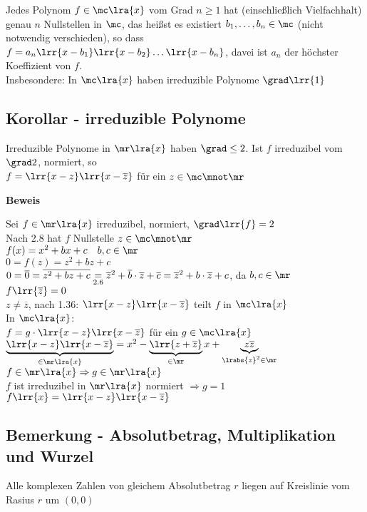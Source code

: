 	Jedes Polynom $f\in\mc\lra{x}$ vom Grad $n\geq 1$ hat (einschließlich Vielfachhalt) genau $n$ Nullstellen in $\mc$, das heißst es existiert $b_1,\dots,b_n\in\mc$ (nicht notwendig verschieden), so dass $f=a_n\lrr{x-b_1}\lrr{x-b_2}\dots\lrr{x-b_n}$, davei ist $a_n$ der höchster Koeffizient von $f$. \\
	Insbesondere: In $\mc\lra{x}$ haben irreduzible Polynome $\grad\lrr{1}$

\subsection{Korollar - irreduzible Polynome}
	Irreduzible Polynome in $\mr\lra{x}$ haben $\grad\leq 2$. Ist $f$ irreduzibel vom $\grad 2$, normiert, so \\
	$f=\lrr{x-z}\lrr{x-\overline{z}}$ für ein $z\in\mc\mnot\mr$
	
	\textbf{Beweis}
	
	Sei $f\in\mr\lra{x}$ irreduzibel, normiert, $\grad\lrr{f}=2$\\
	Nach 2.8 hat $f$ Nullstelle $z\in\mc\mnot\mr$\\
	$f(x)=x^2+bx+c\quad b,c\in\mr$\\
	$0=f(z)=z^2+bz+c$\\
	$0=\overline{0}=\overline{z^2+bz+c} \underset{\mbox{\scriptsize 2.6}}{=}\overline{z}^2+\overline{b}\cdot\overline{z}+\overline{c}=\overline{z}^2+b\cdot\overline{z}+c$, da $b,c\in\mr$\\
	$f\lrr{\overline{z}}=0$\\
	$z\neq\overline{z}$, nach 1.36: $\lrr{x-z}\lrr{x-\overline{z}}$ teilt $f$ in $\mc\lra{x}$\\
	In $\mc\lra{x}$:\\
	$f=g\cdot\lrr{x-z}\lrr{x-\overline{z}}$ für ein $g\in\mc\lra{x}$\\
	$\underbrace{\lrr{x-z}\lrr{x-\overline{z}}}_{\in\mr\lra{x}}=x^2-\underbrace{\lrr{z+\overline{z}}}_{\in\mr}x+\underbrace{z\overline{z}}_{\scriptstyle \lrabs{z}^2\in\mr}$\\
	$f\in\mr\lra{x}\Rightarrow g\in\mr\lra{x}$\\
	$f$ ist irreduzibel in $\mr\lra{x}$ normiert $\Rightarrow g=1$\\
	$f\lrr{x}=\lrr{x-z}\lrr{x-\overline{z}}$

\subsection{Bemerkung - Absolutbetrag, Multiplikation und Wurzel}
		\item Alle komplexen Zahlen von gleichem Absolutbetrag $r$ liegen auf Kreislinie vom Rasius $r$ um $(0,0)$
		

